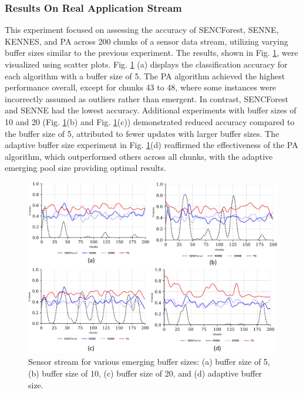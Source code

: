 \subsubsection{Results On Real Application Stream}
\label{sec:sensor}
This experiment focused on assessing the accuracy of SENCForest, SENNE, KENNES, and PA across 200 chunks of a sensor data stream, utilizing varying buffer sizes similar to the previous experiment. The results, shown in Fig. \ref{fig:res2}, were visualized using scatter plots. Fig. \ref{fig:res2} (a) displays the classification accuracy for each algorithm with a buffer size of 5. The PA algorithm achieved the highest performance overall, except for chunks 43 to 48, where some instances were incorrectly assumed as outliers rather than emergent. In contrast, SENCForest and SENNE had the lowest accuracy. Additional experiments with buffer sizes of 10 and 20 (Fig. \ref{fig:res2}(b) and Fig. \ref{fig:res2}(c)) demonstrated reduced accuracy compared to the buffer size of 5, attributed to fewer updates with larger buffer sizes. The adaptive buffer size experiment in Fig. \ref{fig:res2}(d) reaffirmed the effectiveness of the PA algorithm, which outperformed others across all chunks, with the adaptive emerging pool size providing optimal results.

\begin{figure}[!ht]
	\centering
	\includegraphics[width=1\linewidth]{5_Emerging/images/res2.png}
	\caption{Sensor stream for various emerging buffer sizes: (a) buffer size of 5, (b) buffer size of 10, (c) buffer size of 20, and (d) adaptive buffer size.}

	\label{fig:res2}
\end{figure}				

